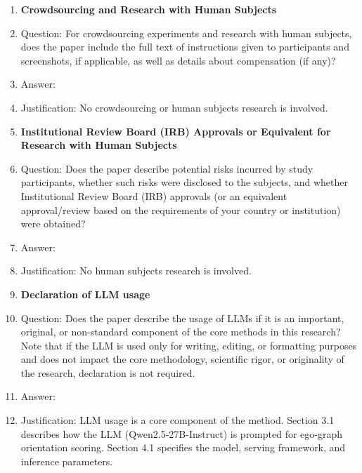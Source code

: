 \begin{enumerate}
\item {\bf Crowdsourcing and Research with Human Subjects}
    \item[] Question: For crowdsourcing experiments and research with human subjects, does the paper include the full text of instructions given to participants and screenshots, if applicable, as well as details about compensation (if any)?
    \item[] Answer: \answerNA{}
    \item[] Justification: No crowdsourcing or human subjects research is involved.

\item {\bf Institutional Review Board (IRB) Approvals or Equivalent for Research with Human Subjects}
    \item[] Question: Does the paper describe potential risks incurred by study participants, whether such risks were disclosed to the subjects, and whether Institutional Review Board (IRB) approvals (or an equivalent approval/review based on the requirements of your country or institution) were obtained?
    \item[] Answer: \answerNA{}
    \item[] Justification: No human subjects research is involved.

\item {\bf Declaration of LLM usage}
    \item[] Question: Does the paper describe the usage of LLMs if it is an important, original, or non-standard component of the core methods in this research? Note that if the LLM is used only for writing, editing, or formatting purposes and does not impact the core methodology, scientific rigor, or originality of the research, declaration is not required.
    \item[] Answer: \answerYes{}
    \item[] Justification: LLM usage is a core component of the method. Section 3.1 describes how the LLM (Qwen2.5-27B-Instruct) is prompted for ego-graph orientation scoring. Section 4.1 specifies the model, serving framework, and inference parameters.

\end{enumerate}
